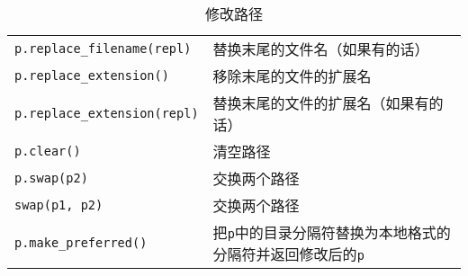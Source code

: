 \begin{table}[ht]
\begin{tabular}{l|l}
        \texttt{p.replace\_filename(repl)}  & 替换末尾的文件名（如果有的话）                                        \\
        \texttt{p.replace\_extension()}     & 移除末尾的文件的扩展名                                            \\
        \texttt{p.replace\_extension(repl)} & 替换末尾的文件的扩展名（如果有的话）                                     \\
        \texttt{p.clear()}                  & 清空路径                                                   \\
        \texttt{p.swap(p2)}                 & 交换两个路径                                                 \\
        \texttt{swap(p1, p2)}               & 交换两个路径                                                 \\
        \texttt{p.make\_preferred()}        & 把\texttt{p}中的目录分隔符替换为本地格式的分隔符并返回修改后的\texttt{p}         \\
        \hline
    \end{tabular}
    \caption{修改路径}
    \label{t20.7}
\end{table}


